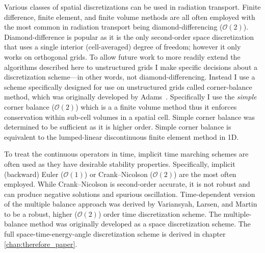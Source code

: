 Various classes of spatial discretizations can be used in radiation transport.
Finite difference, finite element, and finite volume methods are all often employed with the most common in radiation transport being diamond-differencing ($\mathcal{O}(2)$).
Diamond-difference is popular as it is the only second-order space discretization that uses a single interior (cell-averaged) degree of freedom; however it only works on orthogonal grids.
To allow future work to more readily extend the algorithms described here to unstructured grids I make specific decisions about a discretization scheme---in other words, not diamond-differencing.
Instead I use a scheme specifically designed for use on unstructured grids called corner-balance method, which was originally developed by Adams~\cite{adams_subcell_1997}.
Specifically I use the \emph{simple} corner balance ($\mathcal{O}(2)$) which is a a finite volume method thus it enforces conservation within sub-cell volumes in a spatial cell.
Simple corner balance was determined to be sufficient as it is higher  order.
Simple corner balance is equivalent to the lumped-linear discontinuous finite element method in 1D.

To treat the continuous operators in time, implicit time marching schemes are often used as they have desirable stability properties.
Specifically, implicit (backward) Euler ($\mathcal{O}(1)$) or Crank--Nicolson ($\mathcal{O}(2)$) \cite{nicolson_phd, Crank_Nicolson_1947} are the most often employed.
While Crank--Nicolson is second-order accurate, it is not robust and can produce negative solutions and spurious oscillation.
Time-dependent version of the multiple balance approach was derived by Variansyah, Larsen, and Martin~\cite{variansyah_robust_2021, ilham_phd} to be a robust, higher ($\mathcal{O}(2)$) order time discretization scheme.
The multiple-balance method was originally developed as a space discretization scheme.
The full space-time-energy-angle discretization scheme is derived in chapter \ref{chap:therefore_paper}. %

